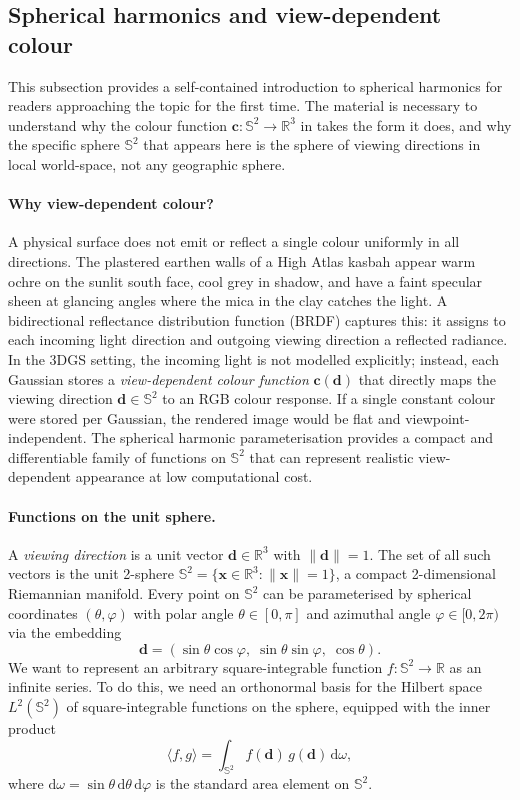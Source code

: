 \documentclass[11pt,a4paper]{article}
\theoremstyle{plain}
\theoremstyle{definition}
\theoremstyle{remark}
\newcommand{\dd}{\mathrm{d}}
\begin{document}
\subsection{Spherical harmonics and view-dependent colour}
\label{sec:prelim_sh}

\noindent
This subsection provides a self-contained introduction to spherical
harmonics for readers approaching the topic for the first time. The
material is necessary to understand why the colour function
$\mathbf{c} : \mathbb{S}^2 \to \mathbb{R}^3$ in 
takes the form it does, and why the specific sphere $\mathbb{S}^2$
that appears here is the sphere of viewing directions in local
world-space, not any geographic sphere.

\paragraph{Why view-dependent colour?}
A physical surface does not emit or reflect a single colour
uniformly in all directions. The plastered earthen walls of a High
Atlas kasbah appear warm ochre on the sunlit south face, cool grey
in shadow, and have a faint specular sheen at glancing angles where
the mica in the clay catches the light. A bidirectional reflectance
distribution function (BRDF) captures this: it assigns to each
incoming light direction and outgoing viewing direction a reflected
radiance. In the 3DGS setting, the incoming light is not modelled
explicitly; instead, each Gaussian stores a \emph{view-dependent
colour function} $\mathbf{c}(\mathbf{d})$ that directly maps the
viewing direction $\mathbf{d} \in \mathbb{S}^2$ to an RGB colour
response. If a single constant colour were stored per Gaussian, the
rendered image would be flat and viewpoint-independent. The spherical
harmonic parameterisation provides a compact and differentiable family
of functions on $\mathbb{S}^2$ that can represent realistic
view-dependent appearance at low computational cost.

\paragraph{Functions on the unit sphere.}
A \emph{viewing direction} is a unit vector
$\mathbf{d} \in \mathbb{R}^3$ with $\|\mathbf{d}\| = 1$. The set of
all such vectors is the unit 2-sphere
$\mathbb{S}^2 = \{\mathbf{x} \in \mathbb{R}^3 : \|\mathbf{x}\| = 1\}$,
a compact 2-dimensional Riemannian manifold. Every point on
$\mathbb{S}^2$ can be parameterised by spherical coordinates
$(\theta, \varphi)$ with polar angle $\theta \in [0, \pi]$ and
azimuthal angle $\varphi \in [0, 2\pi)$ via the embedding
\[
  \mathbf{d} = (\sin\theta\cos\varphi,\; \sin\theta\sin\varphi,\;
                \cos\theta).
\]
We want to represent an arbitrary square-integrable function
$f : \mathbb{S}^2 \to \mathbb{R}$ as an infinite series. To do this,
we need an orthonormal basis for the Hilbert space
$L^2(\mathbb{S}^2)$ of square-integrable functions on the sphere,
equipped with the inner product
\[
  \langle f, g \rangle
  = \int_{\mathbb{S}^2} f(\mathbf{d})\,g(\mathbf{d})\,\dd\omega,
\]
where $\dd\omega = \sin\theta\,\dd\theta\,\dd\varphi$ is the
standard area element on $\mathbb{S}^2$.
\end{document}
